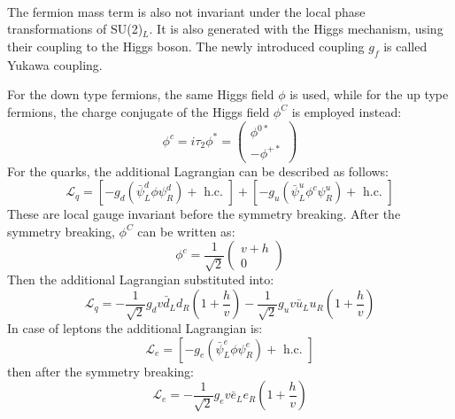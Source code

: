 \\ \\
\noindent\textbf{} \\ 
The fermion mass term is also not invariant under the local phase transformations of SU(2)$_L$. It is also generated with the Higgs mechanism, using their coupling to the Higgs boson. The newly introduced coupling $g_f$ is called Yukawa coupling.

For the down type fermions, the same Higgs field $\phi$ is used, while for the up type fermions, the charge conjugate of the Higgs field $\phi^C$ is employed instead:
\begin{equation}
\phi^{c}=i \tau_{2} \phi^{*}=\left(\begin{array}{c}
\phi^{0 *} \\
-\phi^{+*}
\end{array}\right)
\end{equation}
For the quarks, the additional Lagrangian can be described as follows:
\begin{equation}
\mathcal{L}_{q}=\left[-g_{d}\left(\bar{\psi}_{L}^{d} \phi \psi_{R}^{d}\right)+\text { h.c. }\right]+\left[-g_{u}\left(\bar{\psi}_{L}^{u} \phi^{c} \psi_{R}^{u}\right)+\text { h.c. }\right]
\end{equation}
These are local gauge invariant before the symmetry breaking. After the symmetry breaking, $\phi^C$ can be written as:
\begin{equation}
\phi^{c} 
=\frac{1}{\sqrt{2}}\left(\begin{array}{c}
v+h \\
0
\end{array}\right)
\end{equation}
Then the additional Lagrangian substituted into:
\begin{equation}
\mathcal{L}_{q}=-\frac{1}{\sqrt{2}} g_{d} v \bar{d}_{L} d_{R}\left(1+\frac{h}{v}\right)-\frac{1}{\sqrt{2}} g_{u} v \bar{u}_{L} u_{R}\left(1+\frac{h}{v}\right)
\end{equation}
In case of leptons the additional Lagrangian is:
\begin{equation}
\mathcal{L}_{e}=\left[-g_{e}\left(\bar{\psi}_{L}^{e} \phi \psi_{R}^{e}\right)+\text { h.c. }\right]
\end{equation}
then after the symmetry breaking:
\begin{equation}
\mathcal{L}_{e}=-\frac{1}{\sqrt{2}} g_{e} v \bar{e}_{L} e_{R}\left(1+\frac{h}{v}\right)
\end{equation}

